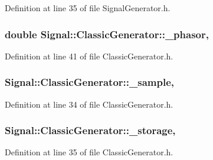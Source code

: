 Definition at line 35 of file Signal\+Generator.\+h.

\hypertarget{class_signal_1_1_classic_generator_ade9b66bc49d2d2f40a1390fc6374b8b2}{
\subsubsection[{\+\_\+phasor}]{\setlength{\rightskip}{0pt plus 5cm}double Signal\+::\+Classic\+Generator\+::\+\_\+phasor\hspace{0.3cm}{\ttfamily [protected]}, {\ttfamily [inherited]}}}\label{class_signal_1_1_classic_generator_ade9b66bc49d2d2f40a1390fc6374b8b2}


Definition at line 41 of file Classic\+Generator.\+h.

\hypertarget{class_signal_1_1_classic_generator_a40313d0d806d6e44af7d41b3ef3a0822}{
\subsubsection[{\+\_\+sample}]{ Signal\+::\+Classic\+Generator\+::\+\_\+sample\hspace{0.3cm}{\ttfamily [protected]}, {\ttfamily [inherited]}}}\label{class_signal_1_1_classic_generator_a40313d0d806d6e44af7d41b3ef3a0822}


Definition at line 34 of file Classic\+Generator.\+h.

\hypertarget{class_signal_1_1_classic_generator_a1214faf589eccb01631700723900bbf9}{
\subsubsection[{\+\_\+storage}]{ Signal\+::\+Classic\+Generator\+::\+\_\+storage\hspace{0.3cm}{\ttfamily [protected]}, {\ttfamily [inherited]}}}\label{class_signal_1_1_classic_generator_a1214faf589eccb01631700723900bbf9}


Definition at line 35 of file Classic\+Generator.\+h.

